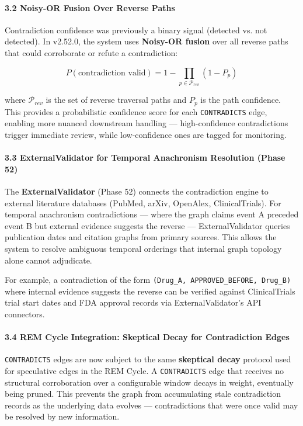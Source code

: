 \paragraph{3.2 Noisy-OR Fusion Over Reverse Paths}
Contra\-diction confidence was previously a binary signal (detected vs. not detected). In v2.52.0, the system uses \textbf{Noisy-OR fusion} over all reverse paths that could corroborate or refute a contr\-adiction:

\begin{equation}
P(\text{contradiction valid}) = 1 - \prod_{p \in \mathcal{P}_{rev}} (1 - P_p)
\end{equation}

where $\mathcal{P}_{rev}$ is the set of reverse traversal paths and $P_p$ is the path confidence. This provides a proba\-bilistic confidence score for each \texttt{CONTRADICTS} edge, enabling more nuanced downstream handling — high-confidence contr\-adictions trigger immediate review, while low-confidence ones are tagged for monitoring.

\paragraph{3.3 ExternalValidator for Temporal Anachronism Resolution (Phase 52)}
The \textbf{ExternalValidator} (Phase 52) connects the contr\-adiction engine to external literature databases (PubMed, arXiv, OpenAlex, ClinicalTrials). For temporal anachronism contr\-adictions — where the graph claims event A preceded event B but external evidence suggests the reverse — ExternalValidator queries publication dates and citation graphs from primary sources. This allows the system to resolve ambiguous temporal orderings that internal graph topology alone cannot adjudicate.

For example, a contr\-adiction of the form \texttt{(Drug\_A, APPROVED\_BEFORE, Drug\_B)} where internal evidence suggests the reverse can be verified against ClinicalTrials trial start dates and FDA approval records via ExternalValidator's API connectors.

\paragraph{3.4 REM Cycle Integration: Skeptical Decay for Contra\-diction Edges}
\texttt{CONTRADICTS} edges are now subject to the same \textbf{skeptical decay} protocol used for speculative edges in the REM Cycle. A \texttt{CONTRADICTS} edge that receives no structural corro\-boration over a confi\-gurable window decays in weight, eventually being pruned. This prevents the graph from accum\-ulating stale contr\-adiction records as the underlying data evolves — contr\-adictions that were once valid may be resolved by new information.


